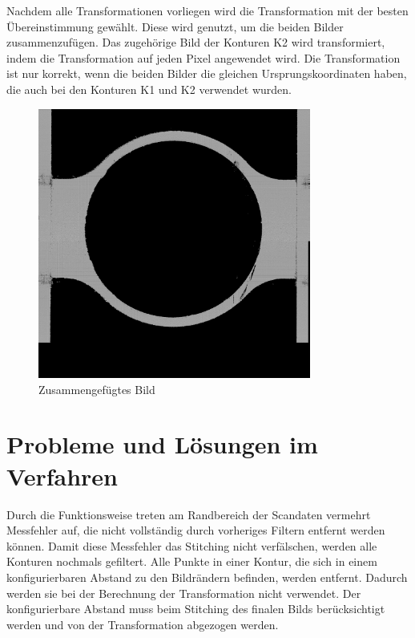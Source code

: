 Nachdem alle Transformationen vorliegen wird die Transformation mit der besten 
Übereinstimmung gewählt. Diese wird genutzt, um die beiden Bilder zusammenzufügen.
Das zugehörige Bild der Konturen K2 wird transformiert, indem die Transformation 
auf jeden Pixel angewendet wird.  
Die Transformation ist nur korrekt, wenn die beiden Bilder die gleichen 
Ursprungskoordinaten haben, die auch bei den Konturen K1 und K2 verwendet wurden.

\begin{figure}[h]
    \centering
    \includegraphics[width=0.8\textwidth]{images/AM_SP0_stitched_2.png} %
    \caption{Zusammengefügtes Bild}
    \label{fig:stitched_image}
\end{figure}

\section{Probleme und Lösungen im Verfahren}

Durch die Funktionsweise treten am Randbereich der Scandaten vermehrt Messfehler auf, 
die nicht vollständig durch vorheriges Filtern entfernt werden können. 
Damit diese Messfehler das Stitching nicht verfälschen, werden alle Konturen nochmals 
gefiltert. Alle Punkte in einer Kontur, die sich in einem konfigurierbaren 
Abstand zu den Bildrändern befinden, werden entfernt. Dadurch werden sie bei der 
Berechnung der Transformation nicht verwendet. 
Der konfigurierbare Abstand muss beim Stitching des finalen Bilds berücksichtigt 
werden und von der Transformation abgezogen werden.

